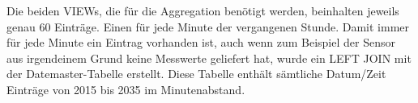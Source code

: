 \noindent
Die beiden VIEWs, die für die Aggregation benötigt werden, beinhalten jeweils genau 60 Einträge. Einen für jede Minute der vergangenen Stunde. Damit immer für jede Minute ein Eintrag vorhanden ist, auch wenn zum Beispiel der Sensor aus irgendeinem Grund keine Messwerte geliefert hat, wurde ein LEFT JOIN mit der Datemaster-Tabelle erstellt. Diese Tabelle enthält sämtliche Datum/Zeit Einträge von 2015 bis 2035 im Minutenabstand.









